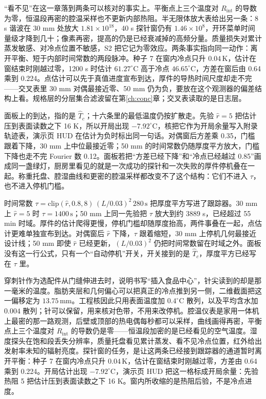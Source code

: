 “看不见”在这一章落到两条可以核对的事实上。平衡点上三个温度对 \(R_{\mathrm{int}}\) 的导数为零，恒温段再密的腔温采样也不更新内部热阻。半无限体放大表给出另一条：8 s 谐波在 30 mm 处放大 \(1.81\times 10^{18}\)，40 s 探针窗仍有 \(1.46\times 10^{8}\)，开环菜单时间量级才降到几十；像素再密，提高的仍是已经衰减掉的高频分量。质量损失对累计蒸发敏感、对冷点位置不敏感，S2 把它记为零效应。两条事实指向同一动作：离开平衡、短于内部时间常数的两段脉冲。种子 7 在窗内冷点只升 \(0.04\,\mathrm{K}\)，估计在窗结束时刚越过零，1200 s 时估计 \(61.27^\circ\mathrm{C}\) 高于冷点 \(46.65^\circ\mathrm{C}\)，方差在窗后由 0.64 乘到 0.224。点估计可以先于真值进度宣布到达，厚件的导热时间尺度却走不完——交叉表里 30 mm 对偶最接近零、50 mm 仍为负，要放在这个观测器的偏差结构上看。规格层的分层集合滤波留在第\ref{ch:conc}章；交叉表读取的是日志层。

面板上的到达，指的是 \(\hat T_c\)；十六条里的最低温度仍按扩散走。先验 \(\hat r=5\) 把估计压到表面读数之下 16 K，所以开局出现 \(-7.92^\circ\mathrm{C}\)，核把它作为开局余量写入附录轨迹表，演示页 HUD 在估计为负时标出同一句话。对偶窗后方差乘 0.35，门槛跟着下降，30 mm 上中位最接近零；50 mm 的时间常数仍随厚度平方放大，门槛下降也走不完 Fourier 数 0.12。面板若把“方差已经下降”和“冷点已经越过 0.85”画成同一盏绿灯，厨房里看见的就是一次成功的探针和一次失败的厚件停机叠在一起。称重托盘、腔湿曲线和更密的腔温采样都改变不了这个结构：它们不进入 \(\tau\)，也不进入停机门槛。

时间常数 \(\tau=\mathrm{clip}(\hat r,0.8,8)\,(L/0.03)^2\,280\,\mathrm{s}\) 把厚度平方写进了跟踪器。30 mm 上 \(\hat r=5\) 时 \(\tau=1400\,\mathrm{s}\)；50 mm 上同一先验把 \(\tau\) 放大到约 3889 s，已经超过 55 min 时域。厚件的估计爬得更慢，停机门槛却随厚度抬高，两件事叠在一起，点估计更难单独宣布到达。对偶窗后 \(\hat r\) 下降，\(\tau\) 跟着缩短，30 mm 上停机几何最接近设计线；50 mm 即使 \(\hat r\) 已经更新，\((L/0.03)^2\) 仍把时间常数留在时域之外。面板没有这一行公式，只有一个“自动停机”开关，开关接到的是 \(\hat T_c\)，厚度平方已经写在 \(\tau\) 里。

穿刺针作为选配件从门缝伸进去时，说明书写“插入食品中心”，针尖读到的却是那一毫米的温度。脂肪夹层和几何偏心可以把真正的冷点推到另一侧，二维截面把这一偏移定为 \(13.75\,\mathrm{mm}\)。工程核因此只用表面温度加 \(0.4^\circ\mathrm{C}\) 散列，以及平均含水加 \(0.004\) 散列；针可以保留，用来核对色带，不用来改停机。腔温仪表是家用一体机上最密的那一路观测，后壁或顶部的热电偶每秒都可以采样，曲线画得再密，平衡点上三个温度对 \(R_{\mathrm{int}}\) 的导数仍是零——恒温段加密的是已经看见的空气温度。湿度探头在饱和段丢失分辨率，质量托盘看见累计蒸发、看不见冷点位置，红外给出发射率未知的辐射亮度。探针窗的任务，是让这两条已经接到跟踪器的通道暂时离开平衡：种子 7 在窗内冷点只升 \(0.04\,\mathrm{K}\)，估计在窗结束时刚越过零，方差由 0.64 乘到 0.224。开局估计出现 \(-7.92^\circ\mathrm{C}\)，演示页 HUD 把这一格标成开局余量：先验热阻 5 把估计压到表面读数之下 16 K。窗内所收缩的是热阻后验，不是冷点进度。
